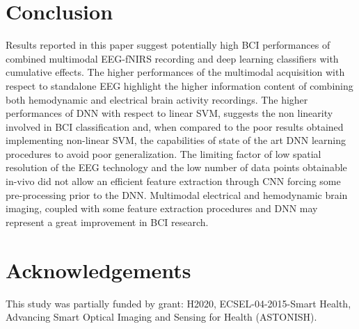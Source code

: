 \documentclass[12pt]{iopart}
\begin{document}
\section{Conclusion}
Results reported in this paper suggest potentially high BCI performances of combined multimodal EEG-fNIRS recording and deep learning classifiers with cumulative effects. The higher performances of the multimodal acquisition with respect to standalone EEG highlight the higher information content of combining both hemodynamic and electrical brain activity recordings. The higher performances of DNN with respect to linear SVM, suggests the non linearity involved in BCI classification and, when compared to the poor results obtained implementing non-linear SVM, the capabilities of state of the art DNN learning procedures to avoid poor generalization. The limiting factor of low spatial resolution of the EEG technology and the low number of data points obtainable in-vivo  did not allow an efficient feature extraction through CNN forcing some pre-processing prior to the DNN. Multimodal electrical and hemodynamic brain imaging, coupled  with some feature extraction procedures and DNN may represent a great improvement in BCI research.

\section{Acknowledgements}
This study was partially funded by grant: H2020, ECSEL-04-2015-Smart Health, Advancing Smart Optical Imaging and Sensing for Health (ASTONISH).
 

\newpage
\printbibliography
\cleardoublepage
{}
\end{document}
